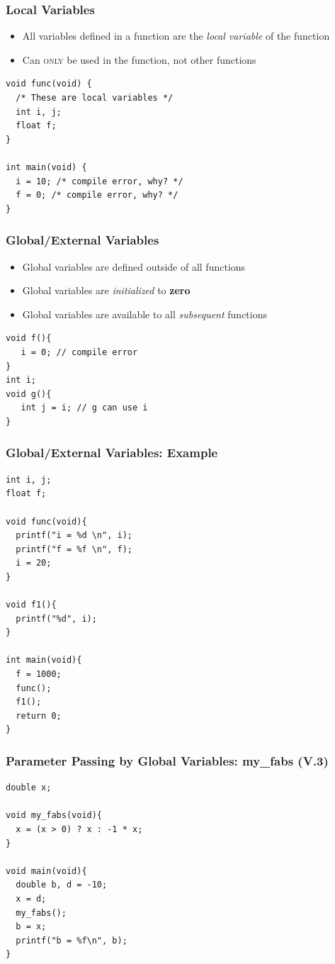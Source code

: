 \documentclass{../c-lecture}
\begin{document}
\begin{frame}[fragile]
  \frametitle{Local Variables}
  \begin{itemize}
    \item
      All variables defined in a function are the
      \textit{\color{YellowOrange} local variable} of the function
    \item
      Can \textsc{\color{LimeGreen} only} be used in the function, not other
      functions
  \end{itemize}
  \scriptsize
  \begin{verbatim}
void func(void) {
  /* These are local variables */
  int i, j;
  float f;
}

int main(void) {
  i = 10; /* compile error, why? */
  f = 0; /* compile error, why? */
}
  \end{verbatim}
\end{frame}

\begin{frame}[fragile]
  \frametitle{Global/External Variables}
  \begin{itemize}
    \item Global variables are defined outside of all functions
    \item
      Global variables are \textit{\color{Cyan} initialized} to
      \textbf{\color{ProcessBlue} zero}
    \item
      Global variables are available to all
      \textit{\color{LimeGreen} subsequent} functions
  \end{itemize}
  \scriptsize
  \begin{verbatim}
void f(){
   i = 0; // compile error
}
int i;
void g(){
   int j = i; // g can use i
}
  \end{verbatim}
\end{frame}

\begin{frame}[fragile]
  \frametitle{Global/External Variables: Example}
  \scriptsize
  \begin{verbatim}
int i, j;
float f;

void func(void){
  printf("i = %d \n", i);
  printf("f = %f \n", f);
  i = 20;
}

void f1(){
  printf("%d", i);
}

int main(void){
  f = 1000;
  func();
  f1();
  return 0;
}
  \end{verbatim}
\end{frame}

\begin{frame}[fragile]
  \frametitle{Parameter Passing by Global Variables: my\_fabs (V.3)}
  \begin{verbatim}
double x;

void my_fabs(void){
  x = (x > 0) ? x : -1 * x;
}

void main(void){
  double b, d = -10;
  x = d;
  my_fabs();
  b = x;
  printf("b = %f\n", b);
}
  \end{verbatim}
\end{frame}
\end{document}
